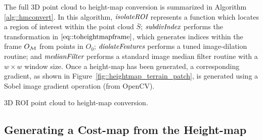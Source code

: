 			The full 3D point cloud to height-map conversion is summarized in Algorithm \ref{alg::hmconvert}. In this algorithm, $\emph{\text{isolateROI}}$ represents a function which locates a region of interest within the point cloud $\bar{S}$; $\emph{\text{subdivIndex}}$ performs the transformation in $\ref{eq::toheightmapframe}$, which generates indices within the frame $O_{{\cal M}}$ from points in $O_{0}$; $\emph{\text{dialateFeatures}}$ performs a tuned image-dilation routine; and $\emph{\text{medianFilter}}$ performs a standard image median filter routine with a $w\times w$ window size. Once a height-map has been generated, a corresponding gradient, as shown in Figure~\ref{fig::heightmap_terrain_patch}, is generated using a Sobel image gradient operation (from OpenCV).
			\begin{algorithm}[!h]
				\begin{algorithmic}
						\EndIf
					\EndFor
				\end{algorithmic}	
				\caption{3D ROI point cloud to height-map conversion.}
				\label{alg::hmconvert}
			\end{algorithm}






		\subsection{Generating a Cost-map from the Height-map}

